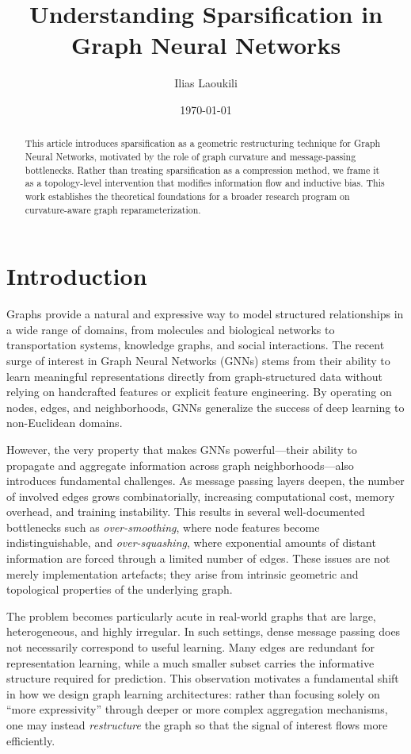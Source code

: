 \documentclass[letterpaper,12pt]{article}
\begin{document}
\title{Understanding Sparsification in Graph Neural Networks}
\author{Ilias Laoukili}
\date{\today}
\maketitle
{} %

\begin{abstract}
This article introduces sparsification as a geometric restructuring technique for Graph Neural Networks, motivated by the role of graph curvature and message-passing bottlenecks. Rather than treating sparsification as a compression method, we frame it as a topology-level intervention that modifies information flow and inductive bias. This work establishes the theoretical foundations for a broader research program on curvature-aware graph reparameterization.
\end{abstract}

\section{Introduction}

Graphs provide a natural and expressive way to model structured relationships in a wide range of domains, from molecules and biological networks to transportation systems, knowledge graphs, and social interactions. The recent surge of interest in Graph Neural Networks (GNNs) stems from their ability to learn meaningful representations directly from graph-structured data without relying on handcrafted features or explicit feature engineering. By operating on nodes, edges, and neighborhoods, GNNs generalize the success of deep learning to non-Euclidean domains.

However, the very property that makes GNNs powerful---their ability to propagate and aggregate information across graph neighborhoods---also introduces fundamental challenges. As message passing layers deepen, the number of involved edges grows combinatorially, increasing computational cost, memory overhead, and training instability. This results in several well-documented bottlenecks such as \textit{over-smoothing}, where node features become indistinguishable, and \textit{over-squashing}, where exponential amounts of distant information are forced through a limited number of edges. These issues are not merely implementation artefacts; they arise from intrinsic geometric and topological properties of the underlying graph.

The problem becomes particularly acute in real-world graphs that are large, heterogeneous, and highly irregular. In such settings, dense message passing does not necessarily correspond to useful learning. Many edges are redundant for representation learning, while a much smaller subset carries the informative structure required for prediction. This observation motivates a fundamental shift in how we design graph learning architectures: rather than focusing solely on “more expressivity” through deeper or more complex aggregation mechanisms, one may instead \emph{restructure} the graph so that the signal of interest flows more efficiently.
\end{document}
